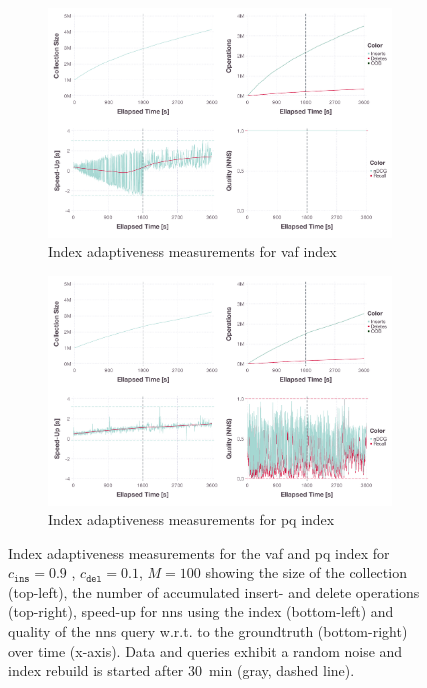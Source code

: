 \begin{figure}[p]
    \begin{subfigure}[b]{\textwidth}
        \centering
        \includegraphics[width=\textwidth]{figures/index/index-vaf-adaptiveness-90-10-with-rebuild-and-jitter}
        \caption{Index adaptiveness measurements for \acrshort{vaf} index}
        \label{figure:index_adaptiveness_vaf_90_10_jitter}
    \end{subfigure}
    \hfill
    \centering
    \begin{subfigure}[b]{\textwidth}
        \centering
        \includegraphics[width=\textwidth]{figures/index/index-pq-adaptiveness-90-10-with-rebuild-and-jitter}
        \caption{Index adaptiveness measurements for \acrshort{pq} index}
        \label{figure:index_adaptiveness_pq_90_10_jitter}
    \end{subfigure} 
    \caption{Index adaptiveness measurements for the \acrshort{vaf} and \acrshort{pq} index for $c_{\texttt{ins}} = 0.9$ , $c_{\texttt{del}} = 0.1$, $M = 100$ showing the size of the collection (top-left), the number of accumulated insert- and delete operations (top-right), speed-up for \acrshort{nns} using the index (bottom-left) and quality of the \acrshort{nns} query w.r.t. to the groundtruth (bottom-right) over time (x-axis). Data and queries exhibit a random noise and index rebuild is started after \SI{30}{\minute} (gray, dashed line).}
    \label{figure:index_adaptiveness_jitter}  
\end{figure}

